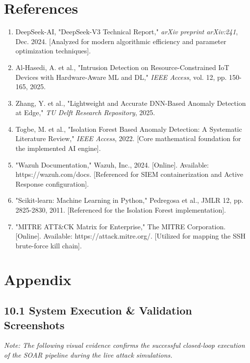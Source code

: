 \documentclass[12pt, a4paper]{report}
\begin{document}
	\chapter*{References}
	\onehalfspacing
	\begin{enumerate}
		\item DeepSeek-AI, "DeepSeek-V3 Technical Report," \textit{arXiv preprint arXiv:241}, Dec. 2024. [Analyzed for modern algorithmic efficiency and parameter optimization techniques].
		\item Al-Hasedi, A. et al., "Intrusion Detection on Resource-Constrained IoT Devices with Hardware-Aware ML and DL," \textit{IEEE Access}, vol. 12, pp. 150-165, 2025.
		\item Zhang, Y. et al., "Lightweight and Accurate DNN-Based Anomaly Detection at Edge," \textit{TU Delft Research Repository}, 2025.
		\item Togbe, M. et al., "Isolation Forest Based Anomaly Detection: A Systematic Literature Review," \textit{IEEE Access}, 2022. [Core mathematical foundation for the implemented AI engine].
		\item "Wazuh Documentation," Wazuh, Inc., 2024. [Online]. Available: https://\-wazuh.com/docs. [Referenced for SIEM containerization and Active Response configuration].
		\item "Scikit-learn: Machine Learning in Python," Pedregosa et al., JMLR 12, pp. 2825-2830, 2011. [Referenced for the Isolation Forest implementation].
		\item "MITRE ATT\&CK Matrix for Enterprise," The MITRE Corporation. [Online]. Available: https://attack.mitre.org/. [Utilized for mapping the SSH brute-force kill chain].
	\end{enumerate}
	
	\chapter*{Appendix}
	\onehalfspacing
	
	\section*{10.1 System Execution \& Validation Screenshots}
	\textit{Note: The following visual evidence confirms the successful closed-loop execution of the SOAR pipeline during the live attack simulations.}
	
\end{document}
